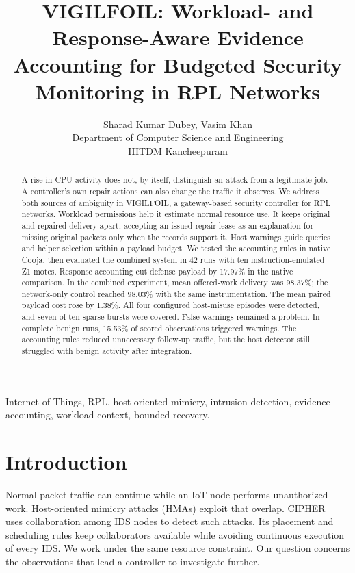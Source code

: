 \documentclass[journal]{IEEEtran}
\title{VIGILFOIL: Workload- and Response-Aware Evidence Accounting for Budgeted Security Monitoring in RPL Networks}
\author{Sharad Kumar Dubey, Vasim Khan\\
\small Department of Computer Science and Engineering\\
\small IIITDM Kancheepuram}
\begin{document}
\maketitle
{}
\begin{abstract}
A rise in CPU activity does not, by itself, distinguish an attack from a legitimate job. A controller's own repair actions can also change the traffic it observes. We address both sources of ambiguity in VIGILFOIL, a gateway-based security controller for RPL networks. Workload permissions help it estimate normal resource use. It keeps original and repaired delivery apart, accepting an issued repair lease as an explanation for missing original packets only when the records support it. Host warnings guide queries and helper selection within a payload budget. We tested the accounting rules in native Cooja, then evaluated the combined system in 42 runs with ten instruction-emulated Z1 motes. Response accounting cut defense payload by 17.97\% in the native comparison. In the combined experiment, mean offered-work delivery was 98.37\%; the network-only control reached 98.03\% with the same instrumentation. The mean paired payload cost rose by 1.38\%. All four configured host-misuse episodes were detected, and seven of ten sparse bursts were covered. False warnings remained a problem. In complete benign runs, 15.53\% of scored observations triggered warnings. The accounting rules reduced unnecessary follow-up traffic, but the host detector still struggled with benign activity after integration.
\end{abstract}
\begin{IEEEkeywords}
Internet of Things, RPL, host-oriented mimicry, intrusion detection, evidence accounting, workload context, bounded recovery.
\end{IEEEkeywords}

\section{Introduction}
Normal packet traffic can continue while an IoT node performs unauthorized work. Host-oriented mimicry attacks (HMAs) exploit that overlap. CIPHER~\cite{sanyal2026cipher} uses collaboration among IDS nodes to detect such attacks. Its placement and scheduling rules keep collaborators available while avoiding continuous execution of every IDS. We work under the same resource constraint. Our question concerns the observations that lead a controller to investigate further.
\end{document}
